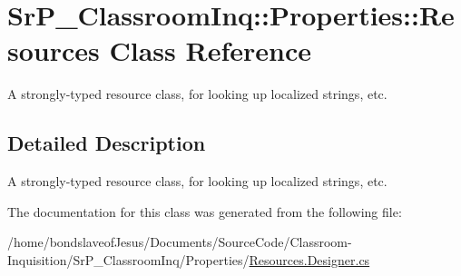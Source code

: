 \hypertarget{class_sr_p___classroom_inq_1_1_properties_1_1_resources}{
\section{\-Sr\-P\-\_\-\-Classroom\-Inq\-:\-:\-Properties\-:\-:\-Resources \-Class \-Reference}
\label{class_sr_p___classroom_inq_1_1_properties_1_1_resources}
}


\-A strongly-\/typed resource class, for looking up localized strings, etc.  




\subsection{\-Detailed \-Description}
\-A strongly-\/typed resource class, for looking up localized strings, etc. 



\-The documentation for this class was generated from the following file\-:\begin{DoxyCompactItemize}
\item 
/home/bondslaveof\-Jesus/\-Documents/\-Source\-Code/\-Classroom-\/\-Inquisition/\-Sr\-P\-\_\-\-Classroom\-Inq/\-Properties/\hyperlink{_resources_8_designer_8cs}{\-Resources.\-Designer.\-cs}\end{DoxyCompactItemize}
